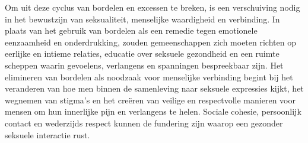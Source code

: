 Om uit deze cyclus van bordelen en excessen te breken, is een verschuiving nodig in het bewustzijn van seksualiteit, menselijke waardigheid en verbinding. In plaats van het gebruik van bordelen als een remedie tegen emotionele eenzaamheid en onderdrukking, zouden gemeenschappen zich moeten richten op eerlijke en intieme relaties, educatie over seksuele gezondheid en een ruimte scheppen waarin gevoelens, verlangens en spanningen bespreekbaar zijn. Het elimineren van bordelen als noodzaak voor menselijke verbinding begint bij het veranderen van hoe men binnen de samenleving naar seksuele expressies kijkt, het wegnemen van stigma's en het creëren van veilige en respectvolle manieren voor mensen om hun innerlijke pijn en verlangens te helen. Sociale cohesie, persoonlijk contact en wederzijds respect kunnen de fundering zijn waarop een gezonder seksuele interactie rust.

